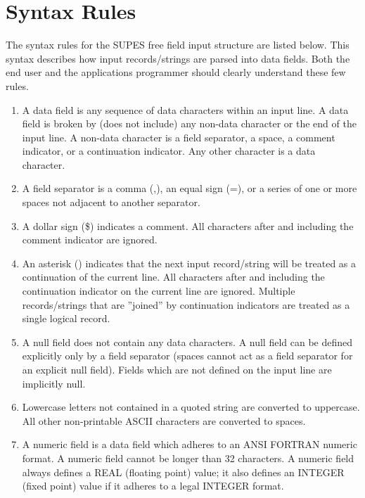 \section{Syntax Rules} \label{sec:syntax}
The syntax rules for the SUPES free field input structure are listed below.
This syntax describes how input records/strings are parsed into data fields.  Both
the end user and the applications programmer should clearly understand these
few rules.
\begin{enumerate}
\item A data field is any sequence of data characters within an input line.  A
   data field is broken by (does not include) any non-data character or the
   end of the input line.  A non-data character is a field separator, a
   space, a comment indicator, or a continuation indicator.  Any other
   character is a data character.

\item A field separator is a comma (,), an equal sign (=), or a series of one
   or more spaces not adjacent to another separator.

\item A dollar sign (\$) indicates a comment.  All characters after and
   including the comment indicator are ignored.

\item An asterisk (\last) indicates that the next input record/string will be
treated as a continuation of the current line.  All characters after and
including the continuation indicator on the current line are ignored. 
Multiple records/strings that are ''joined'' by continuation indicators
are treated as a single logical record.

\item A null field does not contain any data characters.  A null field can be
   defined explicitly only by a field separator (spaces cannot act as a
   field separator for an explicit null field).  Fields which are not
   defined on the input line are implicitly null.

\item \label{itm:case} Lowercase letters not contained in a quoted string
                       are converted to uppercase.  All
                       other non-printable ASCII characters are converted
                       to spaces. 

\item A numeric field is a data field which adheres to an ANSI FORTRAN numeric
   format.  A numeric field cannot be longer than 32 characters.  A numeric
   field always defines a REAL (floating point) value; it also defines an
   INTEGER (fixed point) value if it adheres to a legal INTEGER format.


\end{enumerate}
